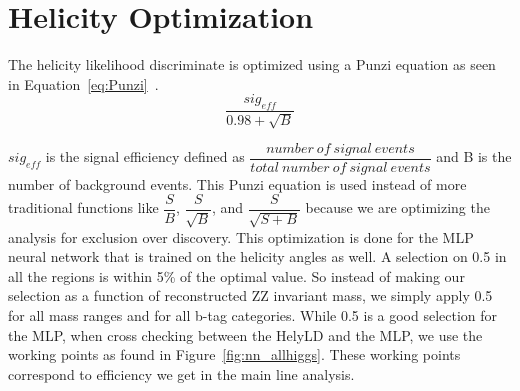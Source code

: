 \section{Helicity Optimization}

The helicity likelihood discriminate is optimized using a Punzi equation as seen in Equation~\ref{eq:Punzi}~\cite{punzi}.
\begin{equation} \dfrac{sig_{eff}}{0.98 + \sqrt{B}} \label{eq:Punzi}\end{equation}

$sig_{eff}$ is the signal efficiency defined as $\dfrac{number\ of\ signal\ events}{total\ number\ of\ signal\ events}$ and B is the number of background events.  This Punzi equation is used instead of more traditional functions like $\dfrac{S}{B}$, $\dfrac{S}{\sqrt{B}}$, and $\dfrac{S}{\sqrt{S+B}}$ because we are optimizing the analysis for exclusion over discovery. This optimization is done for the MLP neural network that is trained on the helicity angles as well. A selection on 0.5 in all the regions is within 5\% of the optimal value. So instead of making our selection as a function of reconstructed ZZ invariant mass, we simply apply 0.5 for all mass ranges and for all b-tag categories.  While 0.5 is a good selection for the MLP, when cross checking between the HelyLD and the MLP, we use the working points as found in Figure~\ref{fig:nn_allhiggs}. These working points correspond to efficiency we get in the main line analysis.


